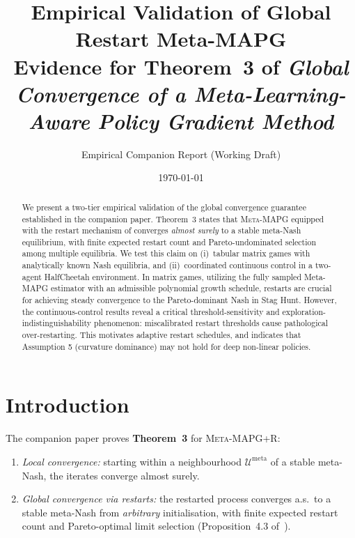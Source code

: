 \documentclass[11pt,a4paper]{article}
\title{%
  \textbf{Empirical Validation of Global Restart Meta-MAPG}\\[4pt]
  \large Evidence for Theorem~3 of \emph{Global Convergence of a
  Meta-Learning-Aware Policy Gradient Method}
}
\author{Empirical Companion Report \quad \small (Working Draft)}
\date{\today}
\newcommand{\MAPG}{\textsc{Meta-MAPG}}
\newcommand{\OUR}{\textsc{Meta-MAPG+R}}
\theoremstyle{remark}
\begin{document}
\maketitle

\begin{abstract}
We present a two-tier empirical validation of the global convergence
guarantee established in the companion paper.
Theorem~3 states that \MAPG{} equipped with the restart mechanism of
\citet{Giannou2022} converges \emph{almost surely} to a stable meta-Nash
equilibrium, with finite expected restart count and Pareto-undominated selection
among multiple equilibria.
We test this claim on (i)~tabular matrix games with analytically known Nash
equilibria, and (ii)~coordinated continuous control in a two-agent HalfCheetah
environment.
In matrix games, utilizing the fully sampled Meta-MAPG estimator with an
admissible polynomial growth schedule, restarts are crucial for achieving steady
convergence to the Pareto-dominant Nash in Stag Hunt.
However, the continuous-control results reveal a critical
threshold-sensitivity and exploration-indistinguishability phenomenon: miscalibrated restart thresholds cause
pathological over-restarting. This motivates adaptive restart schedules, and 
indicates that Assumption 5 (curvature dominance) may not hold for deep non-linear policies.
\end{abstract}

\tableofcontents
\clearpage

\section{Introduction}

The companion paper proves \textbf{Theorem~3} for \OUR{}:
\begin{enumerate}[label=(\roman*)]
  \item \textit{Local convergence:} starting within a neighbourhood
    $\mathcal{U}^{\mathrm{meta}}$ of a stable meta-Nash, the iterates
    converge almost surely.
  \item \textit{Global convergence via restarts:} the restarted process
    converges a.s.\ to a stable meta-Nash from \emph{arbitrary}
    initialisation, with finite expected restart count and Pareto-optimal
    limit selection (Proposition~4.3 of~\citealt{Giannou2022}).
\end{enumerate}
\end{document}
